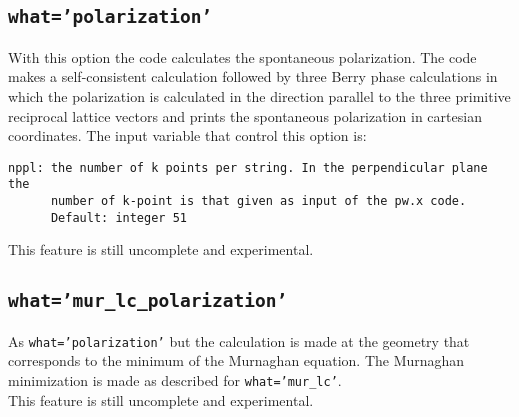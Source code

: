 \documentclass[12pt,a4paper]{article}
\begin{document}
\subsection{\texttt{what='polarization'}}
With this option the code calculates the spontaneous polarization.
The code makes a self-consistent calculation followed by three Berry
phase calculations in which the polarization is calculated in the
direction parallel to the three primitive reciprocal lattice vectors and 
prints the spontaneous polarization in cartesian coordinates.
The input variable that control this option is:
\begin{verbatim}
nppl: the number of k points per string. In the perpendicular plane the
      number of k-point is that given as input of the pw.x code.
      Default: integer 51
\end{verbatim}
This feature is still uncomplete and experimental.

\subsection{\texttt{what='mur\_lc\_polarization'}}
As \texttt{what='polarization'} but the calculation is made at the
geometry that corresponds to the minimum of the Murnaghan equation. The
Murnaghan minimization is made as described for \texttt{what='mur\_lc'}.\\
This feature is still uncomplete and experimental.
\end{document}
